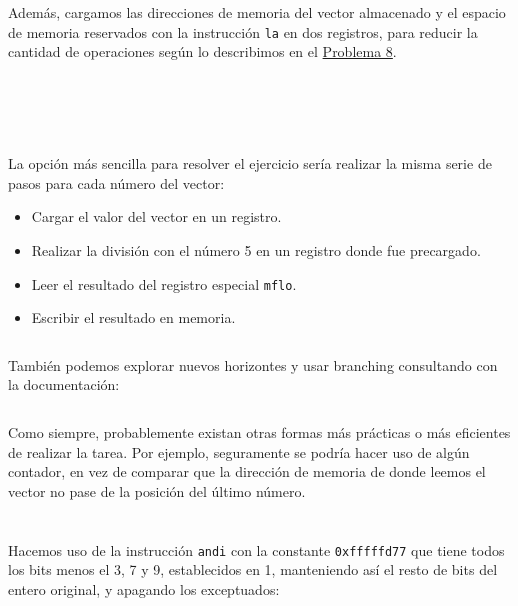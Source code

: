 \documentclass[a4paper]{report}
\begin{document}
Además, cargamos las direcciones de memoria del vector almacenado y el espacio de memoria reservados con la instrucción \texttt{la} en dos registros, para reducir la cantidad de operaciones según lo describimos en el \hyperref[sec:p8]{Problema 8}.

\inputminted[linenos]{mips}{src/problemas/11.asm}

\section{}

\inputminted[linenos]{mips}{src/problemas/12.asm}

\section{}

La opción más sencilla para resolver el ejercicio sería realizar la misma serie de pasos para cada número del vector:

\begin{itemize}
    \item Cargar el valor del vector en un registro.
    \item Realizar la división con el número 5 en un registro donde fue precargado.
    \item Leer el resultado del registro especial \texttt{mflo}.
    \item Escribir el resultado en memoria.
\end{itemize}

\inputminted[linenos]{mips}{src/problemas/13a.asm}

También podemos explorar nuevos horizontes y usar branching consultando con la documentación:

\inputminted[linenos]{mips}{src/problemas/13b.asm}

Como siempre, probablemente existan otras formas más prácticas o más eficientes de realizar la tarea. Por ejemplo, seguramente se podría hacer uso de algún contador, en vez de comparar que la dirección de memoria de donde leemos el vector no pase de la posición del último número.

\section{}

Hacemos uso de la instrucción \texttt{andi} con la constante \texttt{0xfffffd77} que tiene todos los bits menos el 3, 7 y 9, establecidos en 1, manteniendo así el resto de bits del entero original, y apagando los exceptuados:
\end{document}
